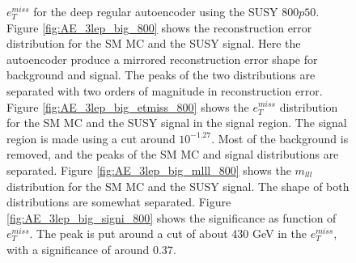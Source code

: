 \begin{figure}[H]
{    $e_T^{miss}$ for the deep regular autoencoder using the SUSY $800p50$. 
    Figure \ref{fig:AE_3lep_big_800} shows the reconstruction error 
    distribution for the SM MC and the SUSY signal. Here the autoencoder produce a mirrored reconstruction error shape for background and 
    signal. The peaks of the two distributions are separated with two orders of magnitude in reconstruction error. Figure \ref{fig:AE_3lep_big_etmiss_800} 
    shows the $e_T^{miss}$ distribution for the SM MC and the SUSY signal in the signal region. 
    The signal region is made using a cut around $10^{-1.27}$. Most of the background is removed, and the peaks of the SM MC and signal 
    distributions are separated. Figure \ref{fig:AE_3lep_big_mlll_800} shows the $m_{lll}$ distribution for the SM MC and the SUSY signal. 
    The shape of both distributions are somewhat separated. Figure \ref{fig:AE_3lep_big_signi_800} shows the significance as function of
    $e_T^{miss}$. The peak is put around a cut of about 430 GeV in the $e_T^{miss}$, with a significance of around $0.37$.}
    \label{fig:AE_3lep_big_rec_sig_signi_800}
\end{figure}

